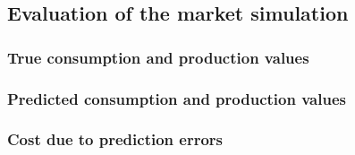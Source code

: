 
\subsection{Evaluation of the market simulation}\label{Sec:Results;Subsec:Simulation}



\subsubsection{True consumption and production values}



\subsubsection{Predicted consumption and production values}



\subsubsection{Cost due to prediction errors}




